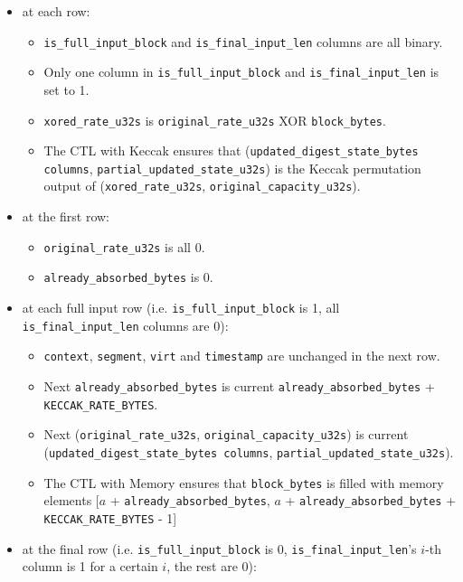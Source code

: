 \begin{itemize}
    \item at each row:
    \begin{itemize}
        \item \texttt{is\_full\_input\_block} and \texttt{is\_final\_input\_len} columns are all binary.
        \item Only one column in \texttt{is\_full\_input\_block} and \texttt{is\_final\_input\_len} is set to 1.
        \item \texttt{xored\_rate\_u32s} is \texttt{original\_rate\_u32s} XOR \texttt{block\_bytes}.
        \item The CTL with Keccak ensures that (\texttt{updated\_digest\_state\_bytes columns}, \texttt{partial\_updated\_state\_u32s}) is the Keccak permutation output of (\texttt{xored\_rate\_u32s}, \texttt{original\_capacity\_u32s}).
    \end{itemize}
    \item at the first row:
    \begin{itemize}
        \item \texttt{original\_rate\_u32s} is all 0.
        \item \texttt{already\_absorbed\_bytes} is 0.
    \end{itemize}
    \item at each full input row (i.e. \texttt{is\_full\_input\_block} is 1, all \texttt{is\_final\_input\_len} columns are 0):
    \begin{itemize}
        \item \texttt{context}, \texttt{segment}, \texttt{virt} and \texttt{timestamp} are unchanged in the next row.
        \item Next \texttt{already\_absorbed\_bytes} is current \texttt{already\_absorbed\_bytes} + \texttt{KECCAK\_RATE\_BYTES}.
        \item Next (\texttt{original\_rate\_u32s}, \texttt{original\_capacity\_u32s}) is current (\texttt{updated\_digest\_state\_bytes columns}, \texttt{partial\_updated\_state\_u32s}).
        \item The CTL with Memory ensures that \texttt{block\_bytes} is filled with memory elements [$a$ + \texttt{already\_absorbed\_bytes}, $a$ + \texttt{already\_absorbed\_bytes} + \texttt{KECCAK\_RATE\_BYTES} - 1]
    \end{itemize}
    \item at the final row (i.e. \texttt{is\_full\_input\_block} is 0, \texttt{is\_final\_input\_len}'s $i$-th column is 1 for a certain $i$, the rest are 0):

\end{itemize}
